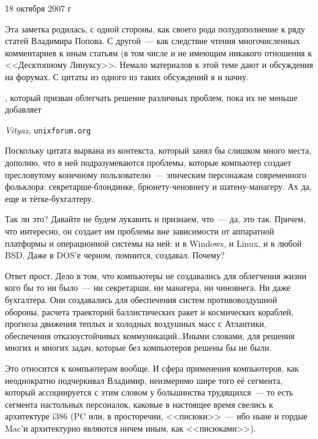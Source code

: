 \begin{timeline}18 октября 2007 г\end{timeline}

Эта заметка родилась, с одной стороны, как своего рода полудополнение к ряду статей Владимира Попова. С другой~--- как следствие чтения многочисленных комментариев к иным статьям (в том числе и не имеющим никакого отношения к <<Десктопному Линуксу>>. Немало материалов к этой теме дают и обсуждения на форумах. С цитаты из одного из таких обсуждений я и начну. 

\hfill \begin{minipage}[h]{0.45\textwidth}
, который призван облегчать решение различных проблем, пока их не меньше добавляет
\begin{flushright}
\textit{Vityaz}, \texttt{unixforum.org}
\end{flushright}
\bigskip\end{minipage}

Поскольку цитата вырвана из контекста, который занял бы слишком много места, дополню, что в ней подразумеваются проблемы, которые компьютер создает пресловутому конечному пользователю~--- эпическим персонажам современного фольклора: секретарше-блондинке, брюнету-ченовнегу и шатену-манагеру. Ах да, еще и тётке-бухгалтеру. 

Так ли это? Давайте не будем лукавить и признаем, что~--- да, это так. Причем, что интересно, он создает им проблемы вне зависимости от аппаратной платформы и операционной системы на ней: и в Windows, и Linux, и в любой BSD. Даже в DOS'е черном, помнится, создавал. Почему? 

Ответ прост. Дело в том, что компьютеры не создавались для облегчения жизни кого бы то ни было~--- ни секретарши, ни манагера, ни чиновнега. Ни даже бухгалтера. Они создавались для обеспечения систем противовоздушной обороны, расчета траекторий баллистических ракет и космических кораблей, прогноза движения теплых и холодных воздушных масс с Атлантики, обеспечения отказоустойчивых коммуникаций\dots Иными словами, для решения многих и многих задач, которые без компьютеров решены бы не были. 

Это относится к компьютерам вообще. И сфера применения компьютеров, как неоднократно подчеркивал Владимир, неизмеримо шире того её сегмента, который ассоциируется с этим словом у большинства трудящихся~--- то есть сегмента настольных персоналок, каковые в настоящее время свелись к архитектуре i386 (PC или, в просторечии, <<писюки>>~--- ибо ныне и гордые Mac'и архитектурно являются ничем иным, как <<писюками>>). 

